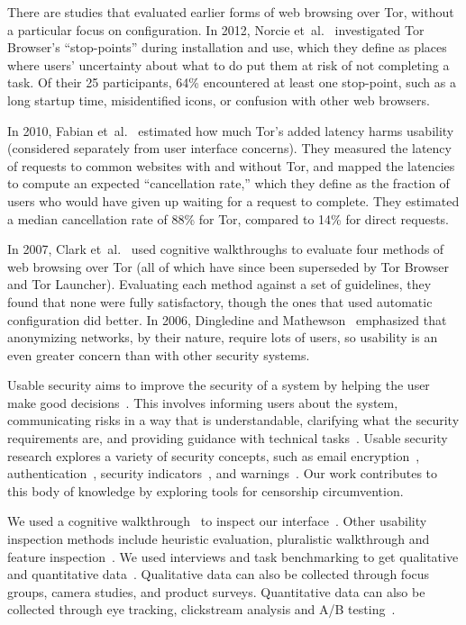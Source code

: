 \documentclass[USenglish,oneside,twocolumn]{article}
\begin{document}
There are studies that evaluated earlier forms of web browsing over Tor,
without a particular focus on configuration.
In 2012, Norcie et~al.~\cite{norcie2012eliminating}
investigated Tor Browser's ``stop-points'' during installation and use,
which they define as places where users' uncertainty about what to do
put them at risk of not completing a task.
Of their 25 participants, 64\% encountered at least one stop-point,
such as a long startup time, misidentified icons, or confusion with other web browsers.

In 2010, Fabian et~al.~\cite{fabian2010privately}
estimated how much Tor's added latency harms usability
(considered separately from user interface concerns).
They measured the latency of requests to common websites with and without Tor,
and mapped the latencies to compute an expected ``cancellation rate,''
which they define as the fraction of users who would have given up waiting for a request to complete.
They estimated a median cancellation rate of 88\% for Tor, compared to 14\% for direct requests.

In 2007, Clark et~al.~\cite{clark2007usability}
used cognitive walkthroughs to evaluate four
methods of web browsing over Tor
(all of which have since been superseded by Tor Browser and Tor Launcher).
Evaluating each method against a set of guidelines,
they found that none were fully satisfactory,
though the ones that used automatic configuration did better.
In 2006, Dingledine and Mathewson~\cite{dingledine2006anonymity}
emphasized that anonymizing networks, by their nature,
require lots of users, so usability is an even greater concern
than with other security systems.

Usable security aims to improve the security of a system by helping the user make good decisions~\cite{payne2008brief}. This involves informing users about the system, communicating risks in a way that is understandable, clarifying what the security requirements are, and providing guidance with technical tasks~\cite{adams1999users}. Usable security research explores a variety of security concepts, such as email encryption~\cite{whitten1999johnny,garfinkel2005johnny}, authentication~\cite{morris1979password,dhamija2000deja,suo2005graphical}, security indicators~\cite{dhamija2006phishing,akhawe2013alice}, and warnings~\cite{schechter2007emperor,egelman2008you}. Our work contributes to this body of knowledge by exploring tools for censorship circumvention.

We used a cognitive walkthrough~\cite{wharton1994cognitive,cognitive-walkthrough} to inspect our interface~\cite{nielsen1994usability}. Other usability inspection methods include heuristic evaluation, pluralistic walkthrough and feature inspection~\cite{inspection}. We used interviews and task benchmarking to get qualitative and quantitative data~\cite{krol2016towards}. Qualitative data can also be collected through focus groups, camera studies, and product surveys. Quantitative data can also be collected through eye tracking, clickstream analysis and A/B testing~\cite{ux-methods}. 
 
\end{document}
